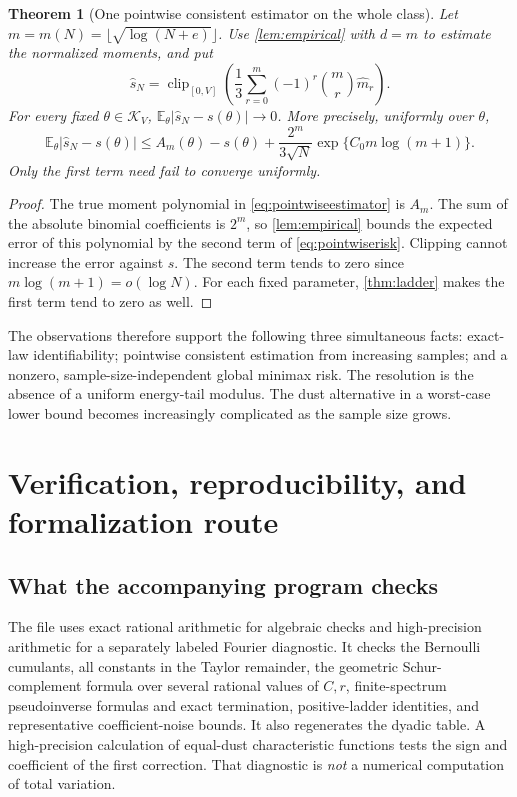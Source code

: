 \documentclass[11pt,letterpaper]{article}
\numberwithin{equation}{section}
\newtheorem{theorem}{Theorem}[section]
\theoremstyle{definition}
\theoremstyle{remark}
\newcommand{\E}{\mathbb E}
\newcommand{\K}{\mathcal K_V}
\newcommand{\clip}{\operatorname{clip}_{[0,V]}}
\begin{document}
\begin{theorem}[One pointwise consistent estimator on the whole class]
\label{thm:pointwise}
Let $m=m(N)=\lfloor\sqrt{\log(N+e)}\rfloor$. Use
\cref{lem:empirical} with $d=m$ to estimate the normalized moments, and put
\begin{equation}
 \widehat s_N=
 \clip\left(\frac13\sum_{r=0}^{m}(-1)^r\binom mr\widehat m_r\right).
 \label{eq:pointwiseestimator}
\end{equation}
For every fixed $\theta\in\K$,
$\E_\theta|\widehat s_N-s(\theta)|\to0$.
More precisely, uniformly over $\theta$,
\begin{equation}
 \E_\theta|\widehat s_N-s(\theta)|
 \le A_m(\theta)-s(\theta)
  +\frac{2^m}{3\sqrt N}\exp\{C_0m\log(m+1)\}.
 \label{eq:pointwiserisk}
\end{equation}
Only the first term need fail to converge uniformly.
\end{theorem}
\begin{proof}
The true moment polynomial in \eqref{eq:pointwiseestimator} is $A_m$.
The sum of the absolute binomial coefficients is $2^m$, so
\cref{lem:empirical} bounds the expected error of this polynomial by the
second term of \eqref{eq:pointwiserisk}. Clipping cannot increase the error
against $s$. The second term tends to zero since
$m\log(m+1)=o(\log N)$. For each fixed parameter, \cref{thm:ladder} makes
the first term tend to zero as well.
\end{proof}

The observations therefore support the following three simultaneous facts:
exact-law identifiability; pointwise consistent estimation from increasing
samples; and a nonzero, sample-size-independent global minimax risk. The
resolution is the absence of a uniform energy-tail modulus. The dust
alternative in a worst-case lower bound becomes increasingly complicated as
the sample size grows.

\section{Verification, reproducibility, and formalization route}
\label{sec:validation}

\subsection{What the accompanying program checks}
The file  uses exact rational arithmetic for algebraic
checks and high-precision arithmetic for a separately labeled Fourier
diagnostic. It checks the Bernoulli cumulants, all constants in the Taylor
remainder, the geometric Schur-complement formula over several rational
values of $C,r$, finite-spectrum pseudoinverse formulas and exact termination,
positive-ladder identities, and representative coefficient-noise bounds.
It also regenerates the dyadic table. A high-precision calculation of equal-dust
characteristic functions tests the sign and coefficient of the first correction.
That diagnostic is \emph{not} a numerical computation of total variation.
\end{document}
